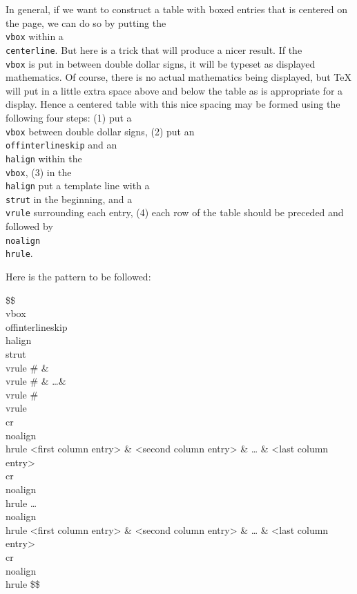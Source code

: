 In general, if we want to construct a table with boxed entries 
that is centered{} on the page, we can do so by putting the {\tt 
\\vbox} within a {\tt \\centerline\lb\rb}\null. But here is a 
trick that will produce a nicer result.  If the {\tt \\vbox} is 
put in between double dollar signs, it will be typeset as 
displayed mathematics.  Of course, there is no actual 
mathematics being displayed, but \TeX{} will put in a little 
extra space above and below the table as is appropriate for a 
display.  Hence a centered{} table with this nice spacing may be 
formed using the following four steps: 
(1) put a {\tt \\vbox} between double dollar signs, 
(2) put an {\tt \\offinterlineskip} and an {\tt \\halign} within 
the {\tt \\vbox}, 
(3) in the {\tt \\halign} put a template line with a {\tt \\strut} 
in the beginning,  and a {\tt \\vrule} surrounding each entry, 
(4) each row of the table should be preceded and followed by 
{\tt \\noalign\lb\\hrule\rb}. 

Here is the pattern to be followed: 

\beginuser 
\$\$\\vbox\lb 
\\offinterlineskip 
\\halign\lb 
\\strut \\vrule \# \& \\vrule \# \& \dots \& \\vrule \# \\vrule \\cr 
\\noalign\lb\\hrule\rb 
<first column entry> \& <second column entry> \& \dots %
\& <last column entry> \\cr 
\\noalign\lb\\hrule\rb 
\dots 
\\noalign\lb\\hrule\rb 
<first column entry> \& <second column entry> \& \dots %
\& <last column entry> \\cr 
\\noalign\lb\\hrule\rb 
\rb 
\rb\$\$ 
\enduser 



